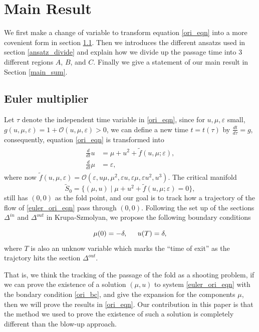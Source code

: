 \documentclass[letterpaper,11pt]{article}
\newcommand{\rmO}{\mathcal{O}}
\newcommand{\eps}{\varepsilon}
\numberwithin{equation}{section}
\theoremstyle{plain}
\begin{document}
\section{Main Result}\label{sec_main}
We first make a change of variable to transform equation \eqref{ori_eqn} into a more covenient form in section \ref{euler_m}. Then we introduces the different ansatzs used in section \ref{ansatz_divide} and explain how we divide up the passage time into 3 different regions $A$, $B$, and $C$. Finally we give a statement of our main result in Section \ref{main_sum}. 

\subsection{Euler multiplier}\label{euler_m}
Let $\tau$ denote the independent time variable in \eqref{ori_eqn}, since for $u,\mu,\eps$ small, $g(u,\mu,\eps) = 1 + \rmO(u,\mu,\eps)>0$, we can define a new time $t = t(\tau)$ by $\frac{dt}{d\tau} = g$, consequently, equation \eqref{ori_eqn}  is transformed into
\begin{align}\label{euler_ori_eqn}
\begin{split}
\frac{d}{dt}u &= \mu+u^2+ \tilde{f}(u,\mu;\eps),\\
\frac{d}{dt}\mu &=  \eps ,
\end{split}
\end{align}
where now $\tilde{f}(u,\mu,\eps) = \rmO(\eps,  u\mu, \mu^2,\eps u, \eps \mu, \eps u^2, u^3)$.  The critical manifold 
\[
\tilde{S}_0 = \{ (\mu, u) \mid \mu + u^2 + \tilde{f}(u,\mu;\eps) = 0\},
\]
still has $(0,0)$ as the fold point, and our goal is to track how a trajectory of the flow of \eqref{euler_ori_eqn} pass through $(0,0)$. Following the set up of the sections $\Delta^{in}$ and $\Delta^{out}$ in Krupa-Szmolyan, we propose the following boundary conditions

\begin{equation}\label{ori_bc}
\mu(0) = -\delta, \hspace{0.2in} u(T) = \delta,
\end{equation}
where $T$ is also an unknow variable which marks the ``time of exit'' as the trajctory hits the section $\Delta^{out}$.

That is, we think the tracking of the passage of the fold as a shooting problem, if we can prove the existence of a solution $(\mu, u)$ to system \eqref{euler_ori_eqn} with the bondary condition \eqref{ori_bc}, and give the expansion for the components $\mu$, then we will prove the results in \eqref{ori_eqn}. Our contribution in this paper is that the method we used to prove the existence of such a solution is completely different than the blow-up approach.
\end{document}
